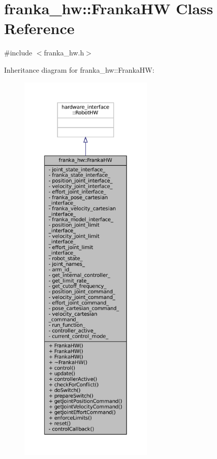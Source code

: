 \hypertarget{classfranka__hw_1_1FrankaHW}{}\section{franka\+\_\+hw\+:\+:Franka\+HW Class Reference}
\label{classfranka__hw_1_1FrankaHW}


{\ttfamily \#include $<$franka\+\_\+hw.\+h$>$}



Inheritance diagram for franka\+\_\+hw\+:\+:Franka\+HW\+:
\nopagebreak
\begin{figure}[H]
\begin{center}
\leavevmode
\includegraphics[height=550pt]{classfranka__hw_1_1FrankaHW__inherit__graph}
\end{center}
\end{figure}


